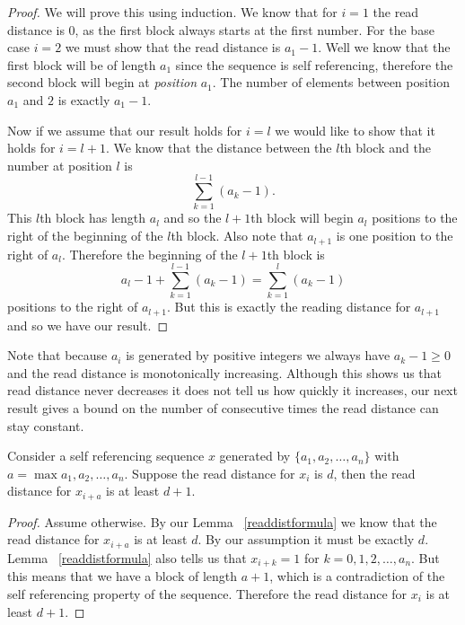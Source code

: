 \documentclass[runningheads,a4paper]{llncs}
\begin{document}
\begin{proof}
We will prove this using induction. We know that for $i=1$ the read distance is $0$, as the first block always starts at the first number. For the base case $i=2$ we must show that the read distance is $a_1-1$. Well we know that the first block will be of length $a_1$ since the sequence is self referencing, therefore the second block will begin at \emph{position} $a_1$. The number of elements between position $a_1$ and $2$ is exactly $a_1 -1$. 

Now if we assume that our result holds for $i=l$ we would like to show that it holds for $i=l+1$. We know that the distance between the $l$th block and the number at position $l$ is 
\begin{equation*}
\sum_{k=1}^{l-1}( a_k - 1).
\end{equation*} 
This $l$th block has length $a_l$ and so the $l+1$th block will begin $a_l$ positions to the right of the beginning of the $l$th block. Also note that $a_{l+1}$ is one position to the right of $a_l$. Therefore the beginning of the $l+1$th block is 
\begin{equation*}
a_l-1 + \sum_{k=1}^{l-1} (a_k-1) = \sum_{k=1}^{l} (a_k-1)
\end{equation*} 
positions to the right of $a_{l+1}$. But this is exactly the reading distance for $a_{l+1}$ and so we have our result.
\end{proof}
Note that because $a_i$ is generated by positive integers we always have $a_k-1\geq 0$ and the read distance is monotonically increasing. Although this shows us that read distance never decreases it does not tell us how quickly it increases, our next result gives a bound on the number of consecutive times the read distance can stay constant. 

\begin{lemma} Consider a self referencing sequence $x$ generated by $\{a_1, a_2, \ldots, a_n\}$ with $a = \max{ a_1, a_2, \ldots, a_n}$. Suppose the read distance for $x_i$ is $d$, then the read distance for $x_{i+a}$ is at least $d+1$. 
\end{lemma}
\begin{proof}
Assume otherwise. By our Lemma ~\ref{readdistformula} we know that the read distance for $x_{i+a}$ is at least $d$. By our assumption it must be exactly $d$. Lemma ~\ref{readdistformula} also tells us that $x_{i+k}=1$ for $k=0,1,2,\ldots, a_n$. But this means that we have a block of length $a+1$, which is a contradiction of the self referencing property of the sequence. Therefore the read distance for $x_{i}$ is at least $d+1$. 
\end{proof}
\end{document}
